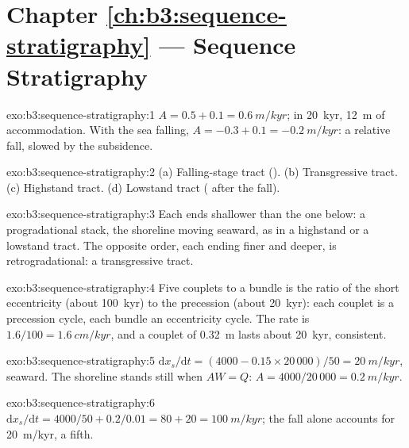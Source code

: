 \section*{Chapter \ref{ch:b3:sequence-stratigraphy} --- Sequence Stratigraphy}

\begin{solution}{exo:b3:sequence-stratigraphy:1}
$A = 0.5 + 0.1 = \qty{0.6}{m/kyr}$; in \qty{20}{kyr}, \qty{12}{m} of
accommodation. With the sea falling, $A = -0.3 + 0.1 = \qty{-0.2}{m/kyr}$: a
relative fall, slowed by the subsidence.
\end{solution}

\begin{solution}{exo:b3:sequence-stratigraphy:2}
(a) Falling-stage tract (). (b) Transgressive tract. (c)
Highstand tract. (d) Lowstand tract ( after the fall).
\end{solution}

\begin{solution}{exo:b3:sequence-stratigraphy:3}
Each  ends shallower than the one below: a progradational stack,
the shoreline moving seaward, as in a highstand or a lowstand tract. The
opposite order, each ending finer and deeper, is retrogradational: a
transgressive tract.
\end{solution}

\begin{solution}{exo:b3:sequence-stratigraphy:4}
Five couplets to a bundle is the ratio of the short eccentricity (about
\qty{100}{kyr}) to the precession (about \qty{20}{kyr}): each couplet is a
precession cycle, each bundle an eccentricity cycle. The rate is
$1.6/100 = \qty{1.6}{cm/kyr}$, and a couplet of \qty{0.32}{m} lasts about
\qty{20}{kyr}, consistent.
\end{solution}

\begin{solution}{exo:b3:sequence-stratigraphy:5}
$\mathrm dx_s/\mathrm dt = (4000 - 0.15\times20\,000)/50 = \qty{20}{m/kyr}$,
seaward. The shoreline stands still when $AW = Q$: $A = 4000/20\,000 =
\qty{0.2}{m/kyr}$.
\end{solution}

\begin{solution}{exo:b3:sequence-stratigraphy:6}
$\mathrm dx_s/\mathrm dt = 4000/50 + 0.2/0.01 = 80 + 20 = \qty{100}{m/kyr}$;
the fall alone accounts for \qty{20}{m/kyr}, a fifth.
\end{solution}

